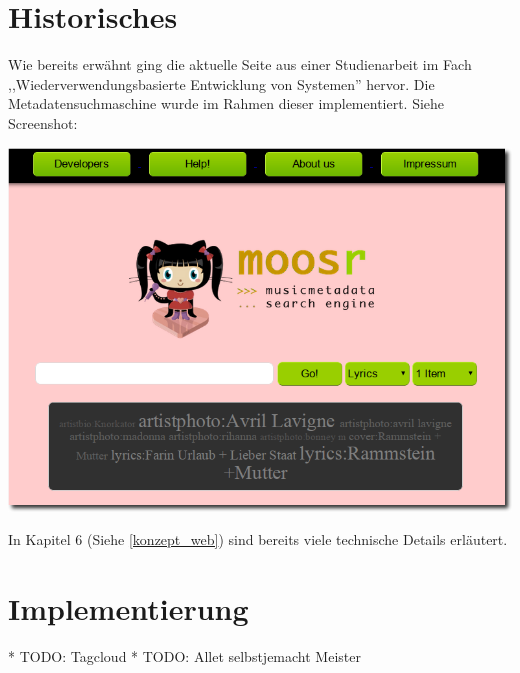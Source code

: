 \section{Historisches}
 
Wie bereits erwähnt ging die aktuelle Seite aus einer Studienarbeit im Fach 
,,Wiederverwendungsbasierte Entwicklung von Systemen'' hervor. Die
Metadatensuchmaschine wurde im Rahmen dieser implementiert. Siehe Screenshot:

\begin{center}
\includegraphics[scale=0.5]{../screenshots/old_site.png}
\end{center}

In Kapitel 6 (Siehe \ref{konzept_web}) sind bereits viele technische Details erläutert.

\section{Implementierung}

* TODO: Tagcloud
* TODO: Allet selbstjemacht Meister
